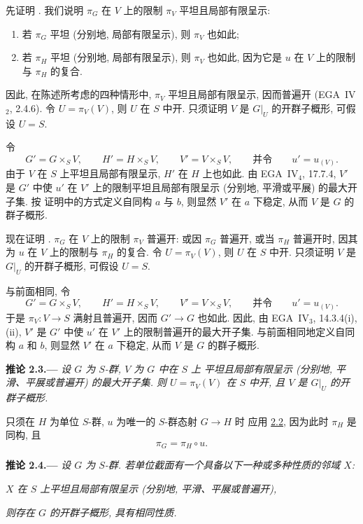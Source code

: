 先证明 \textup{}.
我们说明 \(\pi_G\) 在 \(V\) 上的限制 \(\pi_V\) 平坦且局部有限呈示:
\begin{enumerate}
\item[\textup{a)}] 若 \(\pi_G\) 平坦 (分别地, 局部有限呈示), 则 \(\pi_V\) 也如此;
\item[\textup{b)}] 若 \(\pi_H\) 平坦 (分别地, 局部有限呈示),
  则 \(\pi_V\) 也如此, 因为它是 \(u\) 在 \(V\) 上的限制与 \(\pi_H\) 的复合.
\end{enumerate}
因此, 在陈述所考虑的四种情形中, \(\pi_V\) 平坦且局部有限呈示,
因而普遍开 (EGA~IV\(_2\), 2.4.6).
令 \(U=\pi_V(V)\), 则 \(U\) 在 \(S\) 中开.
只须证明 \(V\) 是 \(G|_U\) 的开群子概形, 可假设 \(U=S\).

令
\[
  G'=G\times_SV,\qquad
  H'=H\times_SV,\qquad
  V'=V\times_SV,
  \qquad\text{并令}\qquad
  u'=u_{(V)}.
\]
由于 \(V\) 在 \(S\) 上平坦且局部有限呈示,
\(H'\) 在 \(H\) 上也如此.
由 EGA~IV\(_4\), 17.7.4,
\(V'\) 是 \(G'\) 中使 \(u'\) 在 \(V'\) 上的限制平坦且局部有限呈示
(分别地, 平滑或平展) 的最大开子集.
按  证明中的方式定义自同构 \(a\) 与 \(b\),
则显然 \(V'\) 在 \(a\) 下稳定, 从而 \(V\) 是 \(G\) 的群子概形.

现在证明 \textup{}.
\(\pi_G\) 在 \(V\) 上的限制 \(\pi_V\) 普遍开:
或因 \(\pi_G\) 普遍开,
或当 \(\pi_H\) 普遍开时, 因其为 \(u\) 在 \(V\) 上的限制与 \(\pi_H\) 的复合.
令 \(U=\pi_V(V)\), 则 \(U\) 在 \(S\) 中开.
只须证明 \(V\) 是 \(G|_U\) 的开群子概形, 可假设 \(U=S\).

与前面相同, 令
\[
  G'=G\times_SV,\qquad
  H'=H\times_SV,\qquad
  V'=V\times_SV,
  \qquad\text{并令}\qquad
  u'=u_{(V)}.
\]
于是 \(\pi_V:V\to S\) 满射且普遍开, 因而 \(G'\to G\) 也如此.
因此, 由 EGA~IV\(_3\), 14.3.4(i),(ii),
\(V'\) 是 \(G'\) 中使 \(u'\) 在 \(V'\) 上的限制普遍开的最大开子集.
与前面相同地定义自同构 \(a\) 和 \(b\),
则显然 \(V'\) 在 \(a\) 下稳定, 从而 \(V\) 是 \(G\) 的群子概形.

\medskip
{}\label{cor:sga3-VIB-2.3}%
\noindent\textbf{推论 2.3.---}
\emph{设 \(G\) 为 \(S\)-群, \(V\) 为 \(G\) 中在 \(S\) 上
平坦且局部有限呈示 (分别地, 平滑、平展或普遍开) 的最大开子集.
则 \(U=\pi_V(V)\) 在 \(S\) 中开,
且 \(V\) 是 \(G|_U\) 的开群子概形.}

只须在 \(H\) 为单位 \(S\)-群,
\(u\) 为唯一的 \(S\)-群态射 \(G\to H\) 时
应用 \hyperref[prop:sga3-VIB-2.2]{2.2},
因为此时 \(\pi_H\) 是同构, 且
\[
  \pi_G=\pi_H\circ u.
\]

\medskip
{}\label{cor:sga3-VIB-2.4}%
\noindent\textbf{推论 2.4.---}
\emph{设 \(G\) 为 \(S\)-群.
若单位截面有一个具备以下一种或多种性质的邻域 \(X\):}
\begin{center}
  \emph{\(X\) 在 \(S\) 上平坦且局部有限呈示
  (分别地, 平滑、平展或普遍开),}
\end{center}
\emph{则存在 \(G\) 的开群子概形, 具有相同性质.}

